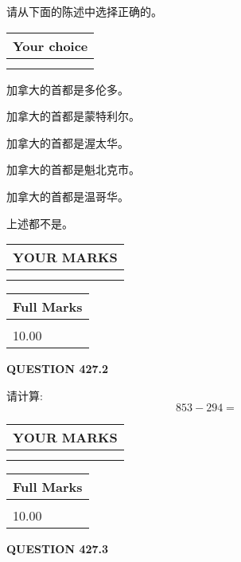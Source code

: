 \documentclass{ctexart}
\begin{document}
  
请从下面的陈述中选择正确的。
  
  
\noindent\hspace{3.0in} \begin{tabular}{|l|}
\hline
Your choice \\
\hline
 \\ 
 \\ 
\hline
\end{tabular}
  
  
 
 
加拿大的首都是多伦多。
 
 
加拿大的首都是蒙特利尔。
 
 
加拿大的首都是渥太华。
 
 
加拿大的首都是魁北克市。
 
 
加拿大的首都是温哥华。
 
 
 上述都不是。
 
 
  
\vspace{0.2in}
  
\noindent\begin{tabular}{|l|}
\hline
 YOUR MARKS  \\
\hline
 \\ 
 \\ 
\hline
\end{tabular}
\hspace{0.05in} \begin{tabular}{|l|}
\hline
 Full Marks  \\
\hline
 \\ 
10.00 \\
\hline
\end{tabular}
{\textbf{\Large{QUESTION
427.2 
}}}
  
  
 
请计算:
\begin{equation}
853 -   %
294 = \nonumber
\end{equation}
 

 

 
  
\vspace{0.2in}
  
\noindent\begin{tabular}{|l|}
\hline
 YOUR MARKS  \\
\hline
 \\ 
 \\ 
\hline
\end{tabular}
\hspace{0.05in} \begin{tabular}{|l|}
\hline
 Full Marks  \\
\hline
 \\ 
10.00 \\
\hline
\end{tabular}
{\textbf{\Large{QUESTION
427.3 
}}}
  
\end{document}
